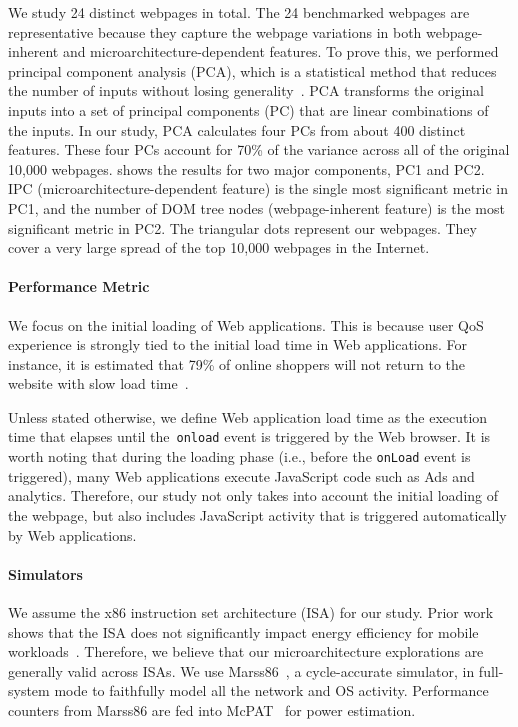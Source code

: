 We study 24 distinct webpages in total. The 24 benchmarked webpages are representative because they capture the webpage variations in both webpage-inherent and microarchitecture-dependent features. To prove this, we performed principal component analysis (PCA), which is a statistical method that reduces the number of inputs without losing generality~\cite{PCA}.  PCA transforms the original inputs into a set of principal components (PC) that are linear combinations of the inputs. In our study, PCA calculates four PCs from about 400 distinct features. These four PCs account for 70\% of the variance across all of the original 10,000 webpages.  shows the results for two major components, PC1 and PC2. IPC (microarchitecture-dependent feature) is the single most significant metric in PC1, and the number of DOM tree nodes (webpage-inherent feature) is the most significant metric in PC2. The triangular dots represent our webpages. They cover a very large spread of the top 10,000 webpages in the Internet.

\paragraph{Performance Metric} We focus on the initial loading of Web applications. This is because user QoS experience is strongly tied to the initial load time in Web applications. For instance, it is estimated that 79\% of online shoppers will not return to the website with slow load time~\cite{Jacob:2013fk}.

Unless stated otherwise, we define Web application load time as the execution time that elapses until the~\texttt{onload} event is triggered by the Web browser. It is worth noting that during the loading phase (i.e., before the \texttt{onLoad} event is triggered), many Web applications execute JavaScript code such as Ads and analytics. Therefore, our study not only takes into account the initial loading of the webpage, but also includes JavaScript activity that is triggered automatically by Web applications.

\paragraph{Simulators} We assume the x86 instruction set architecture (ISA) for our study. Prior work shows that the ISA does not significantly impact energy efficiency for mobile workloads~\cite{risc-cisc}. Therefore, we believe that our microarchitecture explorations are generally valid across ISAs. We use Marss86~\cite{marss}, a cycle-accurate simulator, in full-system mode to faithfully model all the network and OS activity. Performance counters from Marss86 are fed into McPAT~\cite{mcpat} for power estimation.

